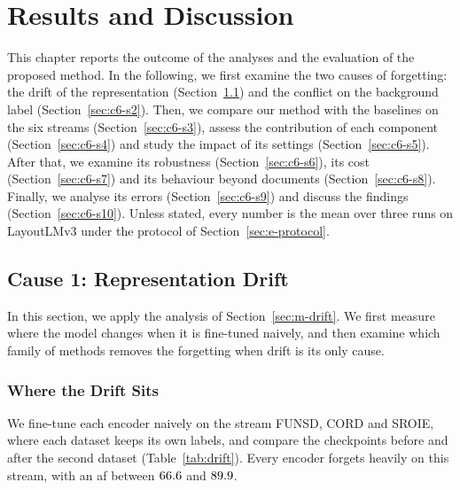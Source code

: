\chapter{Results and Discussion}
\label{ch:results}

This chapter reports the outcome of the analyses and the evaluation of the proposed method.
In the following, we first examine the two causes of forgetting: the drift of the
representation (Section~\ref{sec:c6-s1}) and the conflict on the background label
(Section~\ref{sec:c6-s2}). Then, we compare our method with the baselines on the six streams
(Section~\ref{sec:c6-s3}), assess the contribution of each component
(Section~\ref{sec:c6-s4}) and study the impact of its settings (Section~\ref{sec:c6-s5}).
After that, we examine its robustness (Section~\ref{sec:c6-s6}), its cost
(Section~\ref{sec:c6-s7}) and its behaviour beyond documents (Section~\ref{sec:c6-s8}).
Finally, we analyse its errors (Section~\ref{sec:c6-s9}) and discuss the findings
(Section~\ref{sec:c6-s10}). Unless stated, every number is the mean over three runs on
LayoutLMv3 under the protocol of Section~\ref{sec:e-protocol}.

\section{Cause 1: Representation Drift}
\label{sec:c6-s1}

In this section, we apply the analysis of Section~\ref{sec:m-drift}. We first measure where
the model changes when it is fine-tuned naively, and then examine which family of methods
removes the forgetting when drift is its only cause.

\subsection{Where the Drift Sits}
\label{sec:r-drift-where}

We fine-tune each encoder naively on the stream FUNSD, CORD and SROIE, where each dataset
keeps its own labels, and compare the checkpoints before and after the second dataset
(Table~\ref{tab:drift}). Every encoder forgets heavily on this stream, with an \gls{af}
between $66.6$ and $89.9$.

